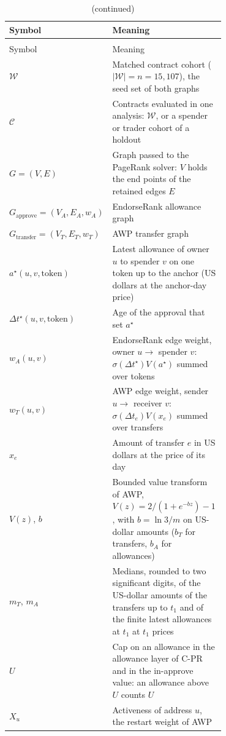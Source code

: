 \begingroup
{}\small\setlength{\tabcolsep}{3.5pt}\captionsetup{font=normalsize}
\begin{longtable}{lp{0.70\linewidth}}
\caption{Notation for graphs, scores, proxies, and parameters.}
\label{tab:notation-methods}\\
\toprule
Symbol & Meaning \\
\midrule
\endfirsthead
\caption[]{(continued)}\\
\toprule
Symbol & Meaning \\
\midrule
\endhead
\bottomrule
\endlastfoot
$\mathcal{W}$ & Matched contract cohort ($|\mathcal{W}|=n=15{,}107$), the seed set of both graphs \\
$\mathcal{C}$ & Contracts evaluated in one analysis: $\mathcal{W}$, or a spender or trader cohort of a holdout \\
$G=(V,E)$ & Graph passed to the PageRank solver: $V$ holds the end points of the retained edges $E$ \\
$G_{\mathrm{approve}}=(V_A,E_A,w_A)$ & EndorseRank allowance graph \\
$G_{\mathrm{transfer}}=(V_T,E_T,w_T)$ & AWP transfer graph \\
$a^{\star}(u,v,\mathrm{token})$ & Latest allowance of owner $u$ to spender $v$ on one token up to the anchor (US dollars at the anchor-day price) \\
$\Delta t^{\star}(u,v,\mathrm{token})$ & Age of the approval that set $a^{\star}$ \\
$w_A(u,v)$ & EndorseRank edge weight, owner $u\to$ spender $v$: $\sigma(\Delta t^{\star})V(a^{\star})$ summed over tokens \\
$w_T(u,v)$ & AWP edge weight, sender $u\to$ receiver $v$: $\sigma(\Delta t_e)V(x_e)$ summed over transfers \\
$x_e$ & Amount of transfer $e$ in US dollars at the price of its day \\
$V(z)$, $b$ & Bounded value transform of AWP, $V(z)=2/(1+e^{-bz})-1$, with $b=\ln 3/m$ on US-dollar amounts ($b_T$ for transfers, $b_A$ for allowances) \\
$m_T$, $m_A$ & Medians, rounded to two significant digits, of the US-dollar amounts of the transfers up to $t_1$ and of the finite latest allowances at $t_1$ at $t_1$ prices \\
$U$ & Cap on an allowance in the allowance layer of C-PR and in the in-approve value: an allowance above $U$ counts $U$ \\
$X_u$ & Activeness of address $u$, the restart weight of AWP \\

\end{longtable}
